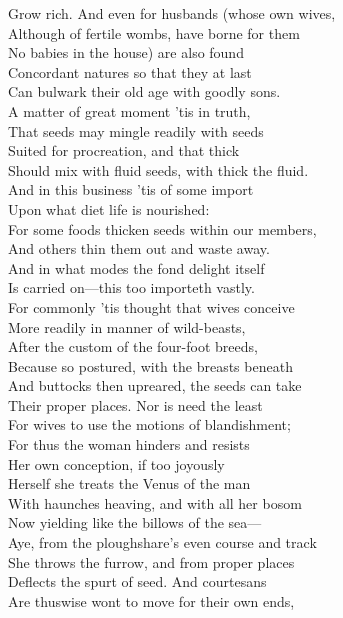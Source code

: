 Grow rich. And even for husbands (whose own wives,\\
Although of fertile wombs, have borne for them\\
No babies in the house) are also found\\
Concordant natures so that they at last\\
Can bulwark their old age with goodly sons.\\
A matter of great moment 'tis in truth,\\
That seeds may mingle readily with seeds\\
Suited for procreation, and that thick\\
Should mix with fluid seeds, with thick the fluid.\\
And in this business 'tis of some import\\
Upon what diet life is nourished:\\
For some foods thicken seeds within our members,\\
And others thin them out and waste away.\\
And in what modes the fond delight itself\\
Is carried on—this too importeth vastly.\\
For commonly 'tis thought that wives conceive\\
More readily in manner of wild-beasts,\\
After the custom of the four-foot breeds,\\
Because so postured, with the breasts beneath\\
And buttocks then upreared, the seeds can take\\
Their proper places. Nor is need the least\\
For wives to use the motions of blandishment;\\
For thus the woman hinders and resists\\
Her own conception, if too joyously\\
Herself she treats the Venus of the man\\
With haunches heaving, and with all her bosom\\
Now yielding like the billows of the sea—\\
Aye, from the ploughshare's even course and track\\
She throws the furrow, and from proper places\\
Deflects the spurt of seed. And courtesans\\
Are thuswise wont to move for their own ends,\\
